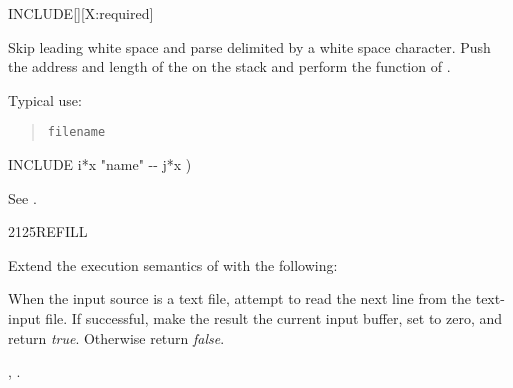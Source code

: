 \begin{worddef}{}{INCLUDE}[][X:required]
\item {}

	Skip leading white space and parse  delimited by a
	white space character. Push the address and length of the
	 on the stack and perform the function of
	.

\see {}%

	\begin{rationale} %
		Typical use:
		\begin{quote}
			 \texttt{filename}
		\end{quote}
	\end{rationale}

	\begin{implement} %
		\word{:} INCLUDE  i*x "name" -{}- j*x ) \\
		\tab {}  \word{;}
	\end{implement}

	\begin{testing} %
		See .
	\end{testing}
\end{worddef}


\begin{worddef}{2125}{REFILL}
\item {}

	Extend the execution semantics of 
	with the following:

	When the input source is a text file, attempt to read the next
	line from the text-input file. If successful, make the result
	the current input buffer, set  to zero, and
	return \emph{true}. Otherwise return \emph{false}.

\see {},
	.
\end{worddef}


